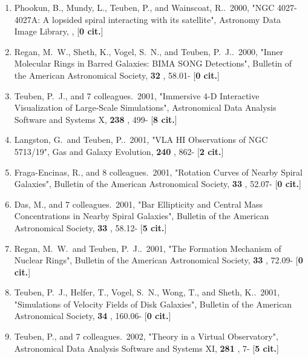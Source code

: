 \documentclass[11pt,letterpaper]{article}
\begin{document}
\begin{enumerate}[resume,label=\textbf{\arabic*}.]
\item  
Phookun, B., Mundy, L., Teuben, P., and Wainscoat, R..\  2000,  "NGC 
4027-4027A: A lopsided spiral interacting with its satellite", Astronomy 
Data Image Library,  ,  [{\bf 0 cit.}] 

\item  
Regan, M.~W., Sheth, K., Vogel, S.~N., and Teuben, P.~J..\  2000,  "Inner 
Molecular Rings in Barred Galaxies: BIMA SONG Detections", Bulletin of the 
American Astronomical Society,  {\bf 32} , 58.01- [{\bf 0 cit.}] 

\item  
Teuben, P.~J., and 7 colleagues.\  2001,  "Immersive 4-D Interactive 
Visualization of Large-Scale Simulations", Astronomical Data Analysis 
Software and Systems X,  {\bf 238} , 499- [{\bf 8 cit.}] 

\item  
Langston, G.~and Teuben, P..\  2001,  "VLA HI Observations of NGC 5713/19", 
Gas and Galaxy Evolution,  {\bf 240} , 862- [{\bf 2 cit.}] 

\item  
Fraga-Encinas, R., and 8 colleagues.\  2001,  "Rotation Curves of Nearby 
Spiral Galaxies", Bulletin of the American Astronomical Society,  {\bf 33} 
, 52.07- [{\bf 0 cit.}] 

\item  
Das, M., and 7 colleagues.\  2001,  "Bar Ellipticity and Central Mass 
Concentrations in Nearby Spiral Galaxies", Bulletin of the American 
Astronomical Society,  {\bf 33} , 58.12- [{\bf 5 cit.}] 

\item  
Regan, M.~W.~and Teuben, P.~J..\  2001,  "The Formation Mechanism of 
Nuclear Rings", Bulletin of the American Astronomical Society,  {\bf 33} , 
72.09- [{\bf 0 cit.}] 

\item  
Teuben, P.~J., Helfer, T., Vogel, S.~N., Wong, T., and Sheth, K..\  2001,  
"Simulations of Velocity Fields of Disk Galaxies", Bulletin of the American 
Astronomical Society,  {\bf 34} , 160.06- [{\bf 0 cit.}] 

\item  
Teuben, P., and 7 colleagues.\  2002,  "Theory in a Virtual Observatory", 
Astronomical Data Analysis Software and Systems XI,  {\bf 281} , 7- [{\bf 5 
cit.}] 


\end{enumerate}
\end{document}
